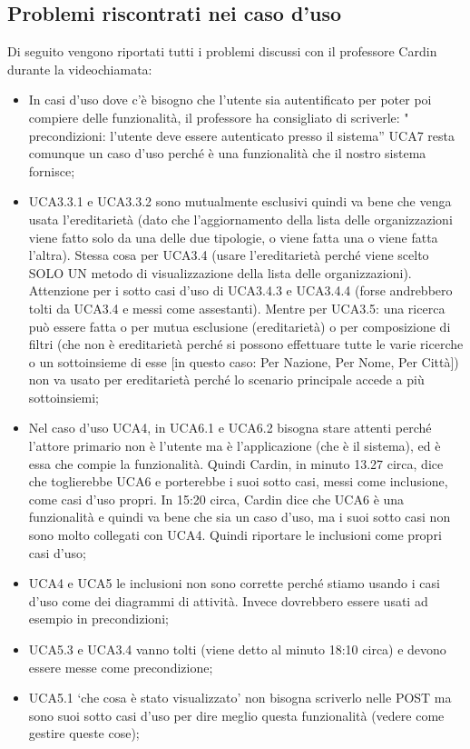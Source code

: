 \subsection{Problemi riscontrati nei caso d'uso}
Di seguito vengono riportati tutti i problemi discussi con il professore Cardin durante la videochiamata:
\begin{itemize}
	\item In casi d’uso dove c’è bisogno che l’utente sia autentificato per poter poi compiere delle funzionalità, il professore ha consigliato di scriverle:
	" precondizioni: l’utente deve essere autenticato presso il sistema”
	UCA7 resta comunque un caso d’uso perché è una funzionalità che il nostro sistema fornisce;
	\item UCA3.3.1 e UCA3.3.2 sono mutualmente esclusivi quindi va bene che venga usata l’ereditarietà
	(dato che l’aggiornamento della lista delle organizzazioni viene fatto solo da una delle due tipologie, o viene fatta una o viene fatta l’altra).
	Stessa cosa per UCA3.4 (usare l’ereditarietà perché viene scelto SOLO UN metodo di visualizzazione della lista delle organizzazioni).
	Attenzione per i sotto casi d’uso di UCA3.4.3 e UCA3.4.4 (forse andrebbero tolti da UCA3.4 e messi come assestanti).
	Mentre per UCA3.5: una ricerca può essere fatta o per mutua esclusione (ereditarietà) o per composizione di filtri (che non è ereditarietà perché si possono effettuare tutte le varie ricerche o un sottoinsieme di esse [in questo caso: Per Nazione, Per Nome, Per Città]) non va usato per ereditarietà perché lo scenario principale accede a più sottoinsiemi;
	\item Nel caso d'uso UCA4, in UCA6.1 e UCA6.2 bisogna stare attenti perché l’attore primario non è l’utente ma è l’applicazione (che è il sistema), ed è essa che compie la funzionalità.
	Quindi Cardin, in minuto 13.27 circa, dice che toglierebbe UCA6 e porterebbe i suoi sotto casi, messi come inclusione, come casi d’uso propri.
	In 15:20 circa, Cardin dice che UCA6 è una funzionalità e quindi va bene che sia un caso d’uso, ma i suoi sotto casi non sono molto collegati con UCA4.
	Quindi riportare le inclusioni come propri casi d'uso;
	\item UCA4 e UCA5 le inclusioni non sono corrette perché stiamo usando i casi d’uso come dei diagrammi di attività. Invece dovrebbero essere usati ad esempio in precondizioni;
	\item UCA5.3 e UCA3.4 vanno tolti (viene detto al minuto 18:10 circa) e devono essere messe come precondizione;
	\item UCA5.1 ‘che cosa è stato visualizzato’ non bisogna scriverlo nelle POST ma sono suoi sotto casi d’uso per dire meglio questa funzionalità (vedere come gestire queste cose);

\end{itemize}
